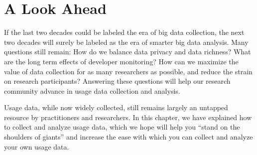 %
%
%

\section{A Look Ahead}

If the last two decades could be labeled the era
of big data collection, 
the next two decades will surely be labeled as the 
era of smarter big data analysis.
Many questions still remain:
How do we balance data privacy and data richness?
What are the long term effects of developer monitoring?
How can we maximize the value of data collection
for as many researchers as possible, and reduce the 
strain on research participants?
Answering these questions will help our research
community advance in usage data collection and analysis.

Usage data, while now widely collected, still remains largely 
an untapped resource by practitioners and researchers.
In this chapter, we have explained how to collect and 
analyze usage data, which we hope will help you ``stand
on the shoulders of giants'' and increase the ease
with which you can collect and analyze your own usage data.
